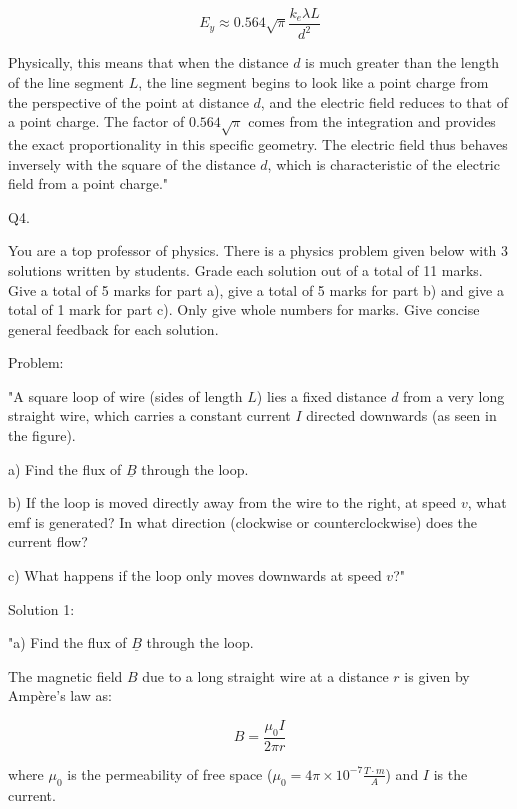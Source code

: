 \[ E_y \approx 0.564 \sqrt{\pi} \frac{k_e \lambda L}{d^2} \]

Physically, this means that when the distance \( d \) is much greater than the length of the line segment \( L \), the line segment begins to look like a point charge from the perspective of the point at distance \( d \), and the electric field reduces to that of a point charge. The factor of \( 0.564 \sqrt{\pi} \) comes from the integration and provides the exact proportionality in this specific geometry. The electric field thus behaves inversely with the square of the distance \( d \), which is characteristic of the electric field from a point charge."



                              Q4. 

You are a top professor of physics. There is a physics problem given below with 3 solutions written by students. Grade each solution out of a total of 11 marks. Give a total of 5 marks for part a), give a total of 5 marks for part b) and give a total of 1 mark for part c). Only give whole numbers for marks. Give concise general feedback for each solution. 

Problem:

"A square loop of wire (sides of length \( L \)) lies a fixed distance \( d \) from a very long straight wire, which carries a constant current \( I \) directed downwards (as seen in the figure).

a) Find the flux of \( \underline{B} \) through the loop.

b) If the loop is moved directly away from the wire to the right, at speed \( v \), what emf is generated? In what direction (clockwise or counterclockwise) does the current flow?

c) What happens if the loop only moves downwards at speed \( v \)?"

Solution 1: 

"a) Find the flux of \( \underline{B} \) through the loop.

The magnetic field \( B \) due to a long straight wire at a distance \( r \) is given by Ampère's law as:

\[
B = \frac{\mu_0 I}{2 \pi r}
\]

where \( \mu_0 \) is the permeability of free space (\( \mu_0 = 4\pi \times 10^{-7} \frac{T \cdot m}{A} \)) and \( I \) is the current.


